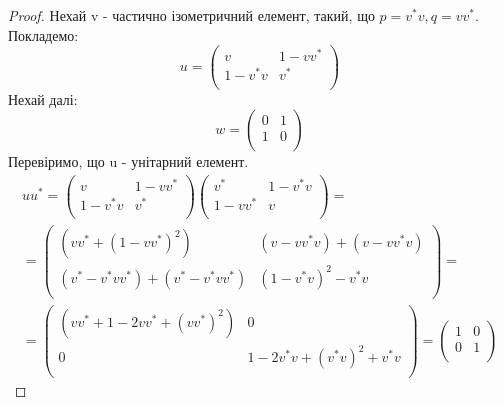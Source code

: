 \begin{lemma}
    \begin{proof}
        Нехай v - частично ізометричний елемент, такий, що
        $p = v^* v, q = v v^*$.
        Покладемо:
        \[
            u = \begin{pmatrix}
                    v & 1 - v v^* \\
                    1 - v^* v & v^* \\
            \end{pmatrix}
        \]
        Нехай далі:
        \[
            w = \begin{pmatrix}
                    0 & 1 \\
                    1 & 0 \\
            \end{pmatrix}
        \]
        Перевіримо, що u - унітарний елемент.
        \begin{multline*}
            u u^* =
            \begin{pmatrix}
                v & 1 - v v^* \\
                1 - v^* v & v^* \\
            \end{pmatrix}
            \begin{pmatrix}
                v^* & 1 - v^* v \\
                1 - v v^* & v \\
            \end{pmatrix} = \\
            = \begin{pmatrix}
                  (v v^* + (1- v v^*)^2) & (v - v v^* v) + (v - v v^* v) \\
                  (v^* - v^* v v^*) + (v^* - v^* v v^*) & (1 - v^* v)^2 - v^* v \\
            \end{pmatrix} = \\
            = \begin{pmatrix}
                  (v v^* + 1 - 2 v v^* + (v v^*)^2) & 0 \\
                  0 & 1 - 2 v^* v + (v^* v)^2 + v^* v \\
            \end{pmatrix} =
            \begin{pmatrix}
                1 & 0 \\
                0 & 1 \\
            \end{pmatrix}
        \end{multline*}

\end{proof}
\end{lemma}
